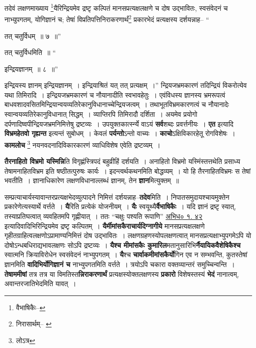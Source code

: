 \documentclass[article,12pt,a4paper]{memoir}
\begin{document}
	तदेवं लक्षणमाख्याय \footnote{वैभाषिकैः--\cite{dp-msD-n}}\-यैरिन्द्रियमेव द्रष्टृ कल्पितं मानसप्रत्यक्षलक्षणे च दोष उद्भावितः, स्वसंवेदनं च नाभ्युपगतम्, योगिज्ञानं च; तेषां विप्रतिपत्तिनिराकरणार्थं\footnote{निरासार्थम्--\cite{dp-msB} \cite{dp-msC} \cite{dp-msD}} प्रकारभेदं प्रत्यक्षस्य दर्शयन्नाह-- “
	  
	तत् चतुर्विधम् ॥ ७ ॥” 
	  
	तत् चतुर्विधमिति ॥ “
	  
	इन्द्रियज्ञानम् ॥ ८ ॥” 
	  
	इन्द्रियस्य ज्ञानम् इन्द्रियज्ञानम् । इन्द्रियाश्रितं यत् तत् प्रत्यक्षम् ।” न्द्रियजभ्रमकारणं तदिन्द्रियं विकरोत्येव यथा तिमिरादि । इन्द्रियजभ्रमकारणं च नौयानादीति स्वभावहेतुः । एवंविधस्य ज्ञानस्य भ्रमरूपत्वं बाधवशादवसितमिन्द्रियान्वयव्यतिरेकानुविधानाच्चेन्द्रियजत्वम् । तथाभूतविभ्रमकारणत्वं च नौयानादेः स्वान्वयव्यतिरेकानुविधानात् सिद्धम् । व्याप्तिरपि तिमिरादौ दर्शिता । अयमेव प्रयोगो दर्पणादिष्वपीन्द्रियजभ्रमनिमित्तेषु द्रष्टव्यः । उपयुक्तकार्त्स्न्ये वाऽयं \textbf{सर्व}शब्दः प्रवर्त्तनीयः । \textbf{एत} इत्यादि \textbf{विभ्रमहेतवो गृह्यन्त} इत्यन्तं सुबोधम् । केवलं \textbf{पर्यन्तो}ऽन्तो वाच्यः । \textbf{काचो}ऽक्षिविकारहेतू रोगविशेषः । \textbf{कामलोच} \footnote{लोऽत्र} नयनवदनादिविकारकारणं व्याधिविशेष एवेति द्रष्टव्यम् ।
	\pend
      

	  \pstart \textbf{तैरनाहितो विभ्रमो यस्मिन्नि}ति विगृह्णंस्त्रिपदं बहुव्रीहिं दर्शयति । अनाहितो विभ्रमो यस्मिंस्तत्तथेति प्रसाध्य तेषामनाहितविभ्रम इति षष्ठीतत्पुरुषः कार्यः । इदन्त्वर्थकथनमिति बोद्धव्यम् । यो हि तैरनाहितविभ्रमः स तेषां भवतीति । ज्ञानाधिकारेण लक्षणविधानाल्लब्धं ज्ञानम्, तेन \textbf{ज्ञान}मित्युक्तम् ॥
	\pend
      

	  \pstart सम्प्रत्याचार्यस्यावान्तरप्रत्यक्षभेदव्युत्पादने निमित्तं दर्शयन्नाह--\textbf{तदेव}मिति । निपातसमुदायश्चायमुक्तेन प्रकारेणेत्यस्यार्थे वर्त्तते । \textbf{यै}रिति प्रत्येकं योजनीयम् । \textbf{यैः} स्वयूथ्यै\textbf{र्वैभाषिकैः} । यदि ज्ञानं द्रष्टृ स्यात्, तस्याप्रतिघत्वात् व्यवहितमपि गृह्णीयात् । ततः “चक्षुः पश्यति रूपाणि” \href{http://http://sarit.indology.info/?cref=ak.1.42}{अभिध० १. ४२} इत्यादिवादिभिरिन्द्रियमेव द्रष्टृ कल्पितम् । \textbf{यैर्मीमांसकैराचार्यदिग्नागीये} मानसप्रत्यक्षलक्षणे गृहीतग्राहित्वलक्षणोऽप्रामाण्यनिमित्तं दोष उद्भावितः । लक्षणग्रहणस्योपलक्षणत्वात् मानसप्रत्यक्षाभ्युपगमेऽपि यो दोषोऽन्धबधिराद्यभावलक्षणः सोऽपि द्रष्टव्यः । \textbf{यैश्च मीमांसकैः कुमारिल}मतानुसारिभि\textbf{र्नैयायिकवैशेषिकैश्च} स्वात्मनि क्रियाविरोधेन स्वसंवेदनं नाभ्युपगतम् । \textbf{यै}श्च \textbf{चार्वाकमीमांसकैर्यो}गिन एव न सम्भवन्ति, कुतस्तेषां ज्ञानमिति \textbf{वादिभिर्योगिज्ञानं च} नाभ्युपगतमिति वर्त्तते । त्रयोऽपि चकारा वक्तव्यान्तरं समुच्चिन्वन्ति । \textbf{तेषाममीषां} तत्र तत्र या विमतिस्त\textbf{न्निराकरणार्थं} प्रत्यक्षस्योक्तलक्षणस्य \textbf{प्रकारो} विशेषस्तस्यं \textbf{भेदं} नानात्वम्, अवान्तरजातिभेदमिति यावत् ।
	\pend
      
\end{document}
